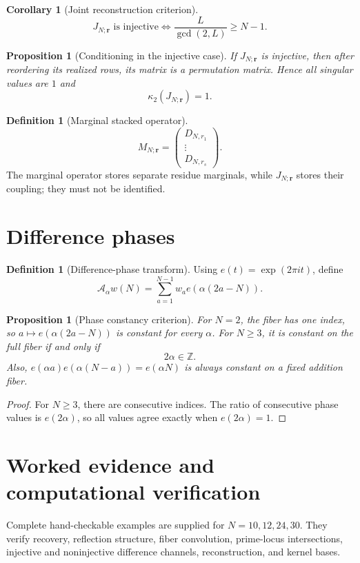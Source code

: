 \documentclass[11pt]{article}
\newtheorem{proposition}[theorem]{Proposition}
\newtheorem{corollary}[theorem]{Corollary}
\theoremstyle{definition}
\newtheorem{definition}[theorem]{Definition}
\newcommand{\Z}{\mathbb Z}
\newcommand{\A}{\mathcal A}
\begin{document}
\begin{corollary}[Joint reconstruction criterion]
\[
J_{N;\mathbf r}\text{ is injective}\iff\frac L{\gcd(2,L)}\ge N-1.
\]
\end{corollary}
\begin{proposition}[Conditioning in the injective case]
If $J_{N;\mathbf r}$ is injective, then after reordering its realized rows, its matrix is a permutation matrix. Hence all singular values are $1$ and
\[
\kappa_2(J_{N;\mathbf r})=1.
\]
\end{proposition}
\begin{definition}[Marginal stacked operator]
\[
M_{N;\mathbf r}=\begin{pmatrix}D_{N,r_1}\\ \vdots\\ D_{N,r_s}\end{pmatrix}.
\]
The marginal operator stores separate residue marginals, while $J_{N;\mathbf r}$ stores their coupling; they must not be identified.
\end{definition}

\section{Difference phases}
\begin{definition}[Difference-phase transform]
Using $e(t)=\exp(2\pi i t)$, define
\[
\A_\alpha w(N)=\sum_{a=1}^{N-1}w_a e(\alpha(2a-N)).
\]
\end{definition}
\begin{proposition}[Phase constancy criterion]
For $N=2$, the fiber has one index, so $a\mapsto e(\alpha(2a-N))$ is constant for every $\alpha$. For $N\ge3$, it is constant on the full fiber if and only if
\[
2\alpha\in\Z.
\]
Also, $e(\alpha a)e(\alpha(N-a))=e(\alpha N)$ is always constant on a fixed addition fiber.
\end{proposition}
\begin{proof}
For $N\ge3$, there are consecutive indices. The ratio of consecutive phase values is $e(2\alpha)$, so all values agree exactly when $e(2\alpha)=1$.
\end{proof}

\section{Worked evidence and computational verification}
Complete hand-checkable examples are supplied for $N=10,12,24,30$. They verify recovery, reflection structure, fiber convolution, prime-locus intersections, injective and noninjective difference channels, reconstruction, and kernel bases.
\end{document}
